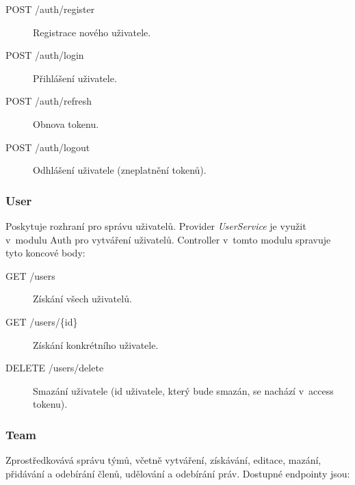 \documentclass[thesis=M,czech]{FITthesis}[2019/12/23]
\begin{document}
\begin{description}
    \item[POST /auth/register] Registrace nového uživatele. 
    \item[POST /auth/login] Přihlášení uživatele.
    \item[POST /auth/refresh] Obnova tokenu.
    \item[POST /auth/logout] Odhlášení uživatele (zneplatnění tokenů).
\end{description}

\subsubsection{User}
Poskytuje rozhraní pro správu uživatelů. Provider \textit{UserService} je využit v~modulu Auth pro vytváření uživatelů. Controller v~tomto modulu spravuje tyto koncové body:

\begin{description}
    \item[GET /users] Získání všech uživatelů.
    \item[GET /users/\{id\}] Získání konkrétního uživatele.
    \item[DELETE /users/delete] Smazání uživatele (id uživatele, který bude smazán, se nachází v~access tokenu).
\end{description}

\subsubsection{Team}
Zprostředkovává správu týmů, včetně vytváření, získávání, editace, mazání, přidávání a odebírání členů, udělování a odebírání práv. Dostupné endpointy jsou:
\end{document}
